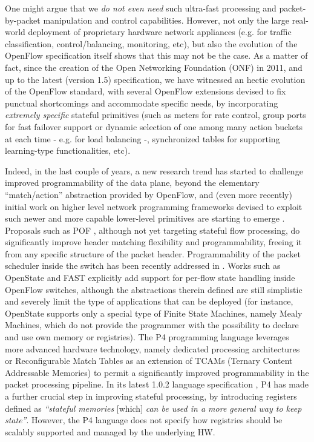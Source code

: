 \documentclass{sig-alternate}
\begin{document}
One might argue that we {\em do not even need} such ultra-fast processing and packet-by-packet manipulation and control capabilities. However, not only the large real-world deployment of proprietary hardware network appliances (e.g. for traffic classification, control/balancing, monitoring, etc), but also the evolution of the OpenFlow specification itself shows that this may not be the case. As a matter of fact, since the creation of the Open Networking Foundation (ONF) in 2011, and up to the latest (version 1.5) specification, we have witnessed an hectic evolution of the OpenFlow standard, with several OpenFlow extensions devised to fix punctual shortcomings and accommodate specific needs, by incorporating {\em extremely specific} stateful primitives (such as meters for rate control, group ports for fast failover support or dynamic selection of one among many action buckets at each time - e.g. for load balancing -, synchronized tables for supporting learning-type functionalities, etc). 

Indeed, in the last couple of years, a new research trend has started to challenge improved programmability of the data plane, beyond the elementary ``match/action'' abstraction provided by OpenFlow, and (even more recently) initial work on higher level network programming frameworks devised to exploit such newer and more capable lower-level primitives are starting to emerge \cite{Sha15,Ara15}. Proposals such as POF \cite{Son13,Son15}, although not yet targeting stateful flow processing, do significantly improve header matching flexibility and programmability, freeing it from any specific structure of the packet header. Programmability of the packet scheduler inside the switch has been recently addressed in \cite{Siv15}. Works such as OpenState \cite{ccr14,Pon15} and FAST \cite{Mos14} explicitly add support for per-flow state handling inside OpenFlow switches, although the abstractions therein defined are still simplistic and severely limit the type of applications that can be deployed (for instance, OpenState supports only a special type of Finite State Machines, namely Mealy Machines, which do not provide the programmer with the possibility to declare and use own memory or registries). The P4 programming language \cite{Bos14,Jos15}  leverages more advanced hardware technology, namely dedicated processing architectures \cite{flexpipe} or Reconfigurable Match Tables \cite{Bos13} as an extension of TCAMs (Ternary Content Addressable Memories) to permit a significantly improved programmability in the packet processing pipeline. In its latest 1.0.2 language specification \cite{P4spec}, P4 has made a further crucial step in improving stateful processing, by introducing registers defined as {\em ``stateful memories} [which] {\em can be used in a more general way to keep state''}. However, the P4 language does not specify how registries should be scalably supported and managed by the underlying HW.
\end{document}
